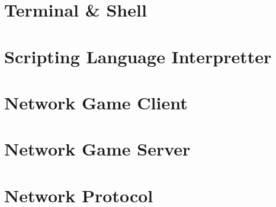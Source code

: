 \newpage
\section{Terminal \& Shell}

\newpage
\section{Scripting Language Interpretter}

\newpage
\section{Network Game Client}

\newpage
\section{Network Game Server}

\newpage
\section{Network Protocol}

